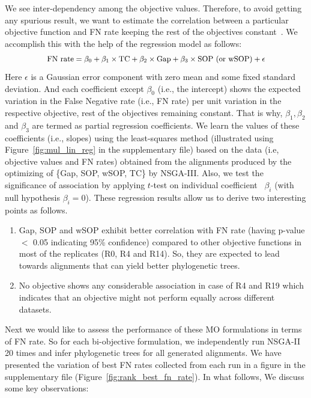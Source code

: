 We see inter-dependency among the objective values. Therefore, to avoid getting any spurious result, we want to estimate the correlation between a particular objective function and FN rate keeping the rest of the objectives constant~\citep{montgomery2012introduction}. We accomplish this with the help of the regression model as follows:
\begin{equation}
\small
\begin{split}
\text{FN rate} = \beta_0 + \beta_1 \times \text{TC}+ \beta_2 \times \text{Gap} + 
\beta_3 \times \text{SOP (or wSOP)} + \epsilon \label{eq:multi_lin_reg}
\end{split}
\end{equation}
Here $\epsilon$ is a Gaussian error component with zero mean and some fixed standard deviation. And each coefficient except $\beta_0$ (i.e., the intercept) shows the expected variation in the False Negative rate (i.e., FN rate) per unit variation in the respective objective, rest of the objectives remaining constant. That is why, $\beta_1, \beta_2$ and $\beta_3$ are termed as partial regression coefficients.  
We learn the values of these coefficients (i.e., slopes) using the least-squares method (illustrated using Figure~\ref{fig:mul_lin_reg} in the supplementary file) based on the data (i.e, objective values and FN rates) obtained from the alignments produced by the optimizing of \{Gap, SOP, wSOP, TC\} by NSGA-III. Also, we test the significance of association by applying $t$-test on individual coefficient  $\beta_i$ (with null hypothesis $\beta_i=0$). These regression results allow us to derive two interesting points as follows.
\begin{enumerate}
	\item Gap, SOP and wSOP exhibit better correlation with FN rate (having p-value $<$ 0.05 indicating 95\% confidence) compared to other objective functions in most of the replicates (R0, R4 and R14). So, they are expected to lead towards alignments that can yield better phylogenetic trees.
	\item No objective shows any considerable association in case of R4 and R19 which indicates that an objective might not perform equally across different datasets. 
\end{enumerate}
Next we would like to assess the performance of these MO formulations in terms of FN rate. So for each bi-objective formulation, we independently run NSGA-II~\citep{deb2002fast} 20 times and infer phylogenetic trees for all generated alignments. We have presented the variation of best FN rates collected from each run in a figure in the supplementary file (Figure~\ref{fig:rank_best_fn_rate}). In what follows, We discuss some key observations:
